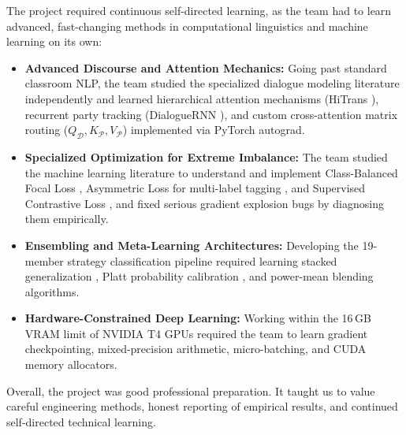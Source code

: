 The project required continuous self-directed learning, as the team had to learn advanced, fast-changing methods in computational linguistics and machine learning on its own:
\begin{itemize}
  \item \textbf{Advanced Discourse and Attention Mechanics:} Going past standard classroom NLP, the team studied the specialized dialogue modeling literature independently and learned hierarchical attention mechanisms (HiTrans \cite{li2020hitrans}), recurrent party tracking (DialogueRNN \cite{majumder2019dialoguernn}), and custom cross-attention matrix routing ($Q_{\mathcal{D}}, K_{\mathcal{P}}, V_{\mathcal{P}}$) implemented via PyTorch autograd.
  \item \textbf{Specialized Optimization for Extreme Imbalance:} The team studied the machine learning literature to understand and implement Class-Balanced Focal Loss \cite{cui2019class}, Asymmetric Loss for multi-label tagging \cite{benbaruch2021asymmetric}, and Supervised Contrastive Loss \cite{khosla2020supervised}, and fixed serious gradient explosion bugs by diagnosing them empirically.
  \item \textbf{Ensembling and Meta-Learning Architectures:} Developing the 19-member strategy classification pipeline required learning stacked generalization \cite{wolpert1992stacked}, Platt probability calibration \cite{platt1999probabilistic}, and power-mean blending algorithms.
  \item \textbf{Hardware-Constrained Deep Learning:} Working within the 16\,GB VRAM limit of NVIDIA T4 GPUs required the team to learn gradient checkpointing, mixed-precision arithmetic, micro-batching, and CUDA memory allocators.\end{itemize}
Overall, the project was good professional preparation. It taught us to value careful engineering methods, honest reporting of empirical results, and continued self-directed technical learning.
